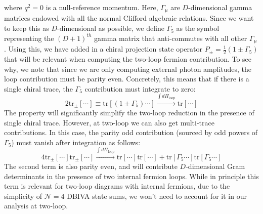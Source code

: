 \documentclass[11pt,letter]{article}
\begin{document}
where $q^2=0$ is a null-reference momentum. Here, $\Gamma_\mu$ are $D$-dimensional gamma matrices endowed with all the normal Clifford algebraic relations. Since we want to keep this as $D$-dimensional as possible, we define $\Gamma_5$ as the symbol representing the $(D+1)^{th}$ gamma matrix that anti-commutes with all other $\Gamma_\mu$. Using this, we have added in a chiral projection state operator $P_{\pm}=\frac{1}{2}(1\pm \Gamma_5)$ that will be relevant when computing the two-loop fermion contribution. To see why, we note that since we are only computing external photon amplitudes, the loop contribution must be {parity even}. Concretely, this means that if there is a single chiral trace, the $\Gamma_5$ contribution must integrate to zero:
\begin{equation}
2\text{tr}_{\pm}[\cdots] \equiv \text{tr}[(1\pm \Gamma_5)\cdots]  \xrightarrow{\int d\Pi_{\text{loop}}} \text{tr}[\cdots]
\end{equation}
The property will significantly simplify the two-loop reduction in the presence of {single} chiral trace. However, at two-loop we can also get multi-trace contributions. In this case, the parity odd contribution (sourced by odd powers of $\Gamma_5$) must vanish after integration as follows:
\begin{equation}
4\text{tr}_{\pm}[\cdots] \text{tr}_{\pm}[\cdots]  \xrightarrow{\int d\Pi_{\text{loop}}} \text{tr}[\cdots]\text{tr}[\cdots]+\text{tr}[\Gamma_5\cdots]\text{tr}[\Gamma_5\cdots]
\end{equation}
The second term is also parity even, and will contribute $D$-dimensional Gram determinants in the presence of two internal fermion loops. While in principle this term is relevant for two-loop diagrams with internal fermions, due to the simplicity of $\mathcal{N}=4$ DBIVA state sums, we won't need to account for it in our analysis at two-loop. 
\end{document}

